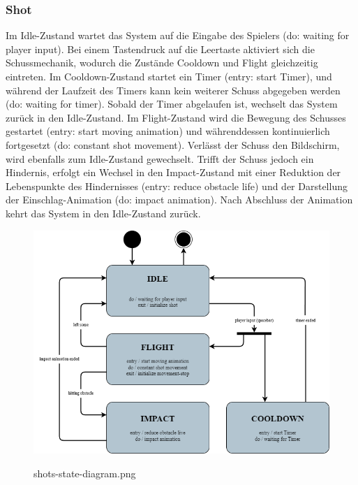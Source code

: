 \documentclass[10pt]{article}
\begin{document}
\newpage
\subsubsection{Shot}
Im Idle-Zustand wartet das System auf die Eingabe des Spielers (do: waiting for player input). Bei einem Tastendruck auf die Leertaste aktiviert sich die Schussmechanik, wodurch die Zustände Cooldown und Flight gleichzeitig eintreten.
Im Cooldown-Zustand startet ein Timer (entry: start Timer), und während der Laufzeit des Timers kann kein weiterer Schuss abgegeben werden (do: waiting for timer). Sobald der Timer abgelaufen ist, wechselt das System zurück in den Idle-Zustand.
Im Flight-Zustand wird die Bewegung des Schusses gestartet (entry: start moving animation) und währenddessen kontinuierlich fortgesetzt (do: constant shot movement). Verlässt der Schuss den Bildschirm, wird ebenfalls zum Idle-Zustand gewechselt. Trifft der Schuss jedoch ein Hindernis, erfolgt ein Wechsel in den Impact-Zustand mit einer Reduktion der Lebenspunkte des Hindernisses (entry: reduce obstacle life) und der Darstellung der Einschlag-Animation (do: impact animation). Nach Abschluss der Animation kehrt das System in den Idle-Zustand zurück.
\begin{figure}
	\centering
	\includegraphics[width=1\textwidth]{../../../images/Pflichtenheft_Assets/uml-state-diagram/shots-state-diagram.png}\\
	\caption{shots-state-diagram.png}
\end{figure}

\newpage
\end{document}
